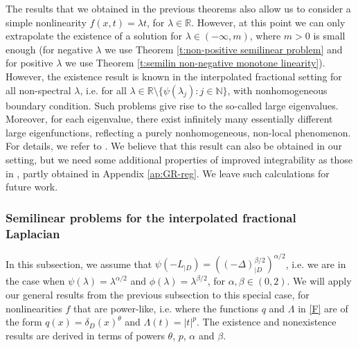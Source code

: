 \documentclass[12pt,a4paper,onecolumn]{article}
\theoremstyle{definition}
\newcommand{\R}{\mathbb{R}}
\newcommand{\N}{\mathbb{N}}
\newcommand{\1}{\mathbf 1}
\newcommand{\de}{\delta_D}
\newcommand{\Lo}{\psi(-L_{|D})}
\newcommand{\INTFR}{\left((-\Delta)^{\beta/2}_{|D}\right)^{\alpha/2}}
\numberwithin{equation}{section}
\begin{document}
    The results that we obtained in the previous theorems also allow us to consider a simple nonlinearity $f(x,t)=\lambda t$, for $\lambda\in \R$. However, at this point we can only extrapolate the existence of a solution for $\lambda\in(-\infty,m)$, where $m>0$ is small enough (for negative $\lambda$ we use Theorem \ref{t:non-positive semilinear problem} and for positive $\lambda$ we use Theorem \ref{t:semilin non-negative monotone linearity}). However, the existence result is known in the interpolated fractional setting for all non-spectral $\lambda$, i.e. for all $\lambda \in \R\setminus\{\psi(\lambda_j):j\in \N\}$, with nonhomogeneous boundary condition. Such problems give rise to the so-called large eigenvalues. Moreover, for each eigenvalue, there exist infinitely many essentially different large eigenfunctions, reflecting a purely nonhomogeneous, non-local phenomenon. For details, we refer to \cite{CGcV-jfa21}. We believe that this result can also be obtained in our setting, but we need some additional properties of improved integrability as those in \cite[Section 3]{CGcV-jfa21}, partly obtained in Appendix \ref{ap:GR-reg}.  We leave such calculations for future work.

	
	\subsubsection*{Semilinear problems for the interpolated fractional Laplacian}
	In this subsection, we assume that $\Lo=\INTFR$, i.e. we are in the case when $\psi(\lambda)=\lambda^{\alpha/2}$ and $\phi(\lambda)=\lambda^{\beta/2}$, for $\alpha,\beta\in (0,2)$. We will apply our general results from the previous subsection to this special case, for nonlinearities $f$ that are power-like, i.e. where the functions $q$ and $\Lambda$ in \ref{F} are of the form $q(x)=\de(x)^\theta$ and $\Lambda(t)=|t|^p$. The existence and nonexistence results are derived in terms of powers $\theta$, $p$, $\alpha$ and $\beta$.
	
\end{document}
